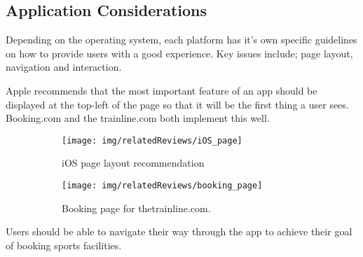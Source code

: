 \subsection{Application Considerations}
\label{sub:application_considerations}

Depending on the operating system, each platform has it's own specific
guidelines on how to provide users with a good experience. Key issues include;
page layout, navigation and interaction.

Apple recommends that the most important feature of an app should be displayed
at the top-left of the page so that it will be the first thing a user
sees\cite{HIGApple2013}.  Booking.com and the trainline.com both implement this
well\cite{BookingcomIOS}.
\begin{figure}[ht]
	\centering
	\begin{subfigure}[b]{0.5\textwidth}
		\texttt{[image: img/relatedReviews/iOS\_page]}
		\caption{iOS page layout recommendation}\label{fig:iOS_page}
	\end{subfigure}%
	\qquad
	\begin{subfigure}[b]{0.25\textwidth}
		\texttt{[image: img/relatedReviews/booking\_page]}
		\caption{Booking page for thetrainline.com\cite{thetrainlineIOS}. }
	\end{subfigure}
	\caption{}\label{fig:booking_page}
\end{figure}

Users should be able to navigate their way through the app to achieve their
goal of booking sports facilities.

